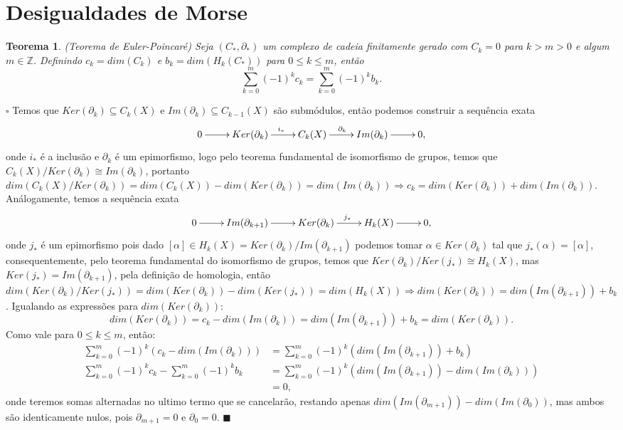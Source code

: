 \documentclass[12pt]{book}
\newtheorem{teorema}{Teorema}[section]
\newenvironment{prova}[1]{$\square$ #1}{\hfill$\blacksquare$}
\newcommand{\classe}[1]{[#1]}
\newcommand{\homologia}[2]{H_{#1}(#2)}
\newcommand{\inteiros}{\mathbb{Z}}
\begin{document}
	\section{Desigualdades de Morse}
	
	\begin{teorema}
		(Teorema de Euler-Poincaré) Seja $(C_{*}, \partial_{*})$ um complexo de cadeia finitamente gerado com $C_{k} = 0$ para $k>m>0$ e algum $m \in \inteiros$. Definindo $c_{k} = dim(C_{k})$ e $b_{k} = dim(\homologia{k}{C_{*}})$ para $0 \leq k \leq m$, então
		$$
		\sum_{k=0}^{m}(-1)^{k}c_{k} = \sum_{k=0}^{m}(-1)^{k}b_{k}.
		$$
	\end{teorema}
	\begin{prova}
		Temos que $Ker(\partial_{k}) \subseteq C_{k}(X)$ e $Im(\partial_{k}) \subseteq C_{k-1}(X)$ são submódulos, então podemos construir a sequência exata
		$$
		\xymatrix{
			0 \ar[r] & Ker(\partial_{k}) \ar[r]^{i_{*}} &  C_{k}(X)  \ar[r]^{\partial_{k}} & Im(\partial_{k}) \ar[r] & 0,
		}
		$$
		onde $i_{*}$ é a inclusão e $\partial_{k}$ é um epimorfismo, logo pelo teorema fundamental de isomorfismo de grupos, temos que $ C_{k}(X)/Ker(\partial_{k}) \cong Im(\partial_{k})$, portanto $dim(C_{k}(X)/Ker(\partial_{k})) = dim(C_{k}(X)) - dim(Ker(\partial_{k})) = dim(Im(\partial_{k})) \Rightarrow c_{k} = dim(Ker(\partial_{k})) + dim(Im(\partial_{k}))$. Análogamente, temos a sequência exata
		$$
		\xymatrix{
			0 \ar[r] & Im(\partial_{k+1}) \ar[r] &  Ker(\partial_{k})  \ar[r]^{j_{*}} & \homologia{k}{X}\ar[r] & 0,
		}
		$$
		onde $j_{*}$ é um epimorfismo pois dado $\classe{\alpha} \in \homologia{k}{X} = Ker(\partial_{k})/Im(\partial_{k+1})$ podemos tomar $\alpha \in Ker(\partial_{k})$ tal que $j_{*}(\alpha) = \classe{\alpha}$, consequentemente, pelo teorema fundamental do isomorfismo de grupos, temos que $Ker(\partial_{k})/Ker(j_{*}) \cong \homologia{k}{X}$, mas $Ker(j_{*}) = Im(\partial_{k+1})$, pela definição de homologia, então $dim(Ker(\partial_{k})/Ker(j_{*})) = dim(Ker(\partial_{k})) - dim(Ker(j_{*})) = dim(\homologia{k}{X}) \Rightarrow dim(Ker(\partial_{k})) = dim(Im(\partial_{k+1}))+ b_{k}$. Igualando as expressões para $dim(Ker(\partial_{k}))$:
		$$
		dim(Ker(\partial_{k})) = c_{k} - dim(Im(\partial_{k})) = dim(Im(\partial_{k+1}))+ b_{k} = dim(Ker(\partial_{k})).
		$$
		Como vale para $0 \leq k \leq m$, então:
		$$
		\begin{aligned}
		\sum_{k=0}^{m}	(-1)^{k}(c_{k} - dim(Im(\partial_{k}))) &= \sum_{k=0}^{m}	(-1)^{k}( dim(Im(\partial_{k+1}))+ b_{k})
		\\
		\sum_{k=0}^{m}	(-1)^{k}c_{k} - \sum_{k=0}^{m}(-1)^{k} b_{k} &= \sum_{k=0}^{m}	(-1)^{k} (dim(Im(\partial_{k+1})) -  dim(Im(\partial_{k})))
		\\
		&= 0,
		\end{aligned}
		$$
		onde teremos somas alternadas no ultimo termo que se cancelarão, restando apenas $dim(Im(\partial_{m+1})) - dim(Im(\partial_{0}))$, mas ambos são identicamente nulos, pois $\partial_{m+1} = 0$ e $\partial_{0} = 0$.
	\end{prova}
	
\end{document}
